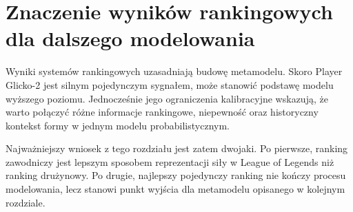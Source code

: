 \section{Znaczenie wyników rankingowych dla dalszego modelowania}

Wyniki systemów rankingowych uzasadniają budowę metamodelu. Skoro Player Glicko-2 jest silnym
pojedynczym sygnałem, może stanowić podstawę modelu wyższego poziomu. Jednocześnie jego ograniczenia
kalibracyjne wskazują, że warto połączyć różne informacje rankingowe, niepewność oraz historyczny
kontekst formy w jednym modelu probabilistycznym.

Najważniejszy wniosek z tego rozdziału jest zatem dwojaki. Po pierwsze, ranking zawodniczy jest
lepszym sposobem reprezentacji siły w League of Legends niż ranking drużynowy. Po drugie, najlepszy
pojedynczy ranking nie kończy procesu modelowania, lecz stanowi punkt wyjścia dla metamodelu
opisanego w kolejnym rozdziale.
